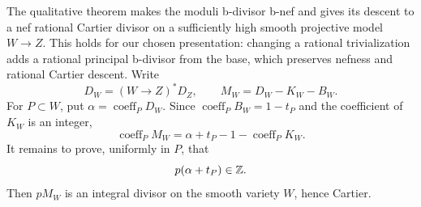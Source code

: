 The qualitative theorem makes the moduli b-divisor b-nef and gives its
descent to a nef rational Cartier divisor on a sufficiently high smooth
projective model $W\to Z$.  This holds for our chosen presentation:
changing a rational trivialization adds a rational principal b-divisor
from the base, which preserves nefness and rational Cartier descent.
Write
\[
 D_W=(W\to Z)^*D_Z,
 \qquad M_W=D_W-K_W-B_W.
\]
For $P\subset W$, put $\alpha=\operatorname{coeff}_P D_W$.  Since
$\operatorname{coeff}_P B_W=1-t_P$ and the coefficient of $K_W$ is an
integer,
\[
 \operatorname{coeff}_P M_W
   =\alpha+t_P-1-\operatorname{coeff}_P K_W.
\]
It remains to prove, uniformly in $P$, that
\begin{equation}\label{eq:relative-coefficient-target}
 p(\alpha+t_P)\in\mathbb Z.
\end{equation}
Then $pM_W$ is an integral divisor on the smooth variety $W$, hence Cartier.
